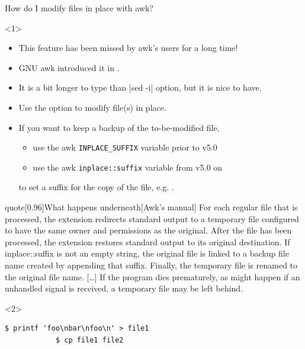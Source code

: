 \begin{frame}[fragile]{How do I modify files in place with awk?}
    \vspace{-1mm}
    \begin{onlyenv}<1>
        \begin{itemize}
            \item This feature has been missed by awk's users for a long time!
            \item GNU awk introduced it in .
            \item It is a bit longer to type than \;\bash|sed -i|\; option, but it is nice to have.
            \item Use the \;\; option to modify file(s) in place.
            \item If you want to keep a backup of the to-be-modified file,
                  \begin{itemize}
                      \item use the awk \texttt{INPLACE\_SUFFIX} variable prior to v5.0
                      \item use the awk \texttt{inplace::suffix} variable from v5.0 on
                  \end{itemize}
                  to set a suffix for the copy of the file, e.g. .
        \end{itemize}
        \begin{varblock}{quote}[0.96\textwidth]{What happens underneath}[Awk's manual]
            For each regular file that is processed, the extension redirects standard output to a temporary file configured to have the same owner and permissions as the original.
            After the file has been processed, the extension restores standard output to its original destination.
            If inplace::suffix is not an empty string, the original file is linked to a backup file name created by appending that suffix.
            Finally, the temporary file is renamed to the original file name.
            [\ldots]
            If the program dies prematurely, as might happen if an unhandled signal is received, a temporary file may be left behind.
        \end{varblock}
    \end{onlyenv}
    \begin{onlyenv}<2>
        \begin{lstlisting}[style=myBash, numbers=none, aboveskip=2mm]
            $ printf 'foo\nbar\nfoo\n' > file1
            $ cp file1 file2

\end{lstlisting}
\end{onlyenv}
\end{frame}

